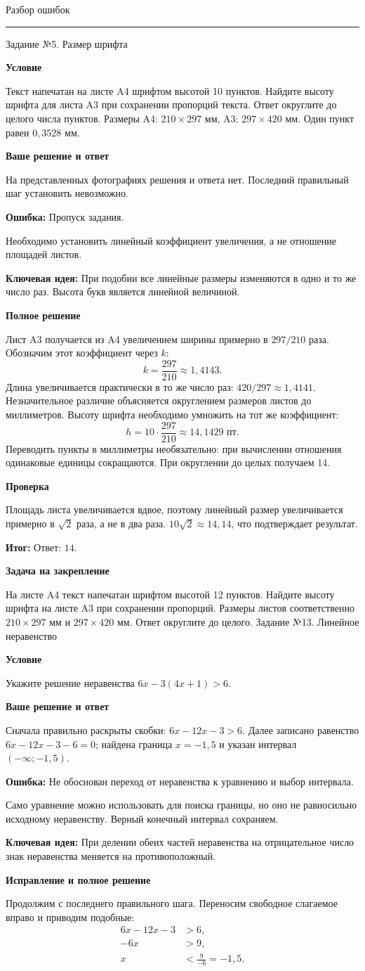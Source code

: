 \documentclass[a4paper,12pt]{article}
\newcommand{\task}[2]{\clearpage\phantomsection\label{task:#1}{\Large\color{darkaccent} Задание №#1. #2}\par\vspace{2mm}{\color{accent}\hrule}\vspace{2mm}}
\newcommand{\sub}[1]{\par\smallskip\textcolor{darkaccent}{\textbf{#1}}\par}
\newcommand{\error}[1]{\par\textcolor{err}{\textbf{Ошибка:}} #1\par}
\newcommand{\idea}[1]{\par\textcolor{darkaccent}{\textbf{Ключевая идея:}} #1\par}
\newcommand{\result}[1]{\par\textcolor{darkaccent}{\textbf{Итог:}} #1\par}
\newcommand{\practice}[1]{\par\medskip{\color{accent}\hrule}\smallskip\textcolor{darkaccent}{\textbf{Задача на закрепление}}\par #1}
\newcommand{\missing}{\sub{Ваше решение и ответ}На представленных фотографиях решения и ответа нет. Последний правильный шаг установить невозможно.}
\begin{document}
\begin{center}
{\Huge\color{darkaccent} Разбор ошибок}\par\bigskip
{\color{accent}\rule{.55\linewidth}{.5pt}}
\end{center}
\vspace*{\fill}
\task{5}{Размер шрифта}
\sub{Условие}
Текст напечатан на листе A4 шрифтом высотой 10 пунктов. Найдите высоту шрифта для листа A3 при сохранении пропорций текста. Ответ округлите до целого числа пунктов. Размеры A4: $210\times297$ мм, A3: $297\times420$ мм. Один пункт равен $0{,}3528$ мм.
\missing
\error{Пропуск задания.} Необходимо установить линейный коэффициент увеличения, а не отношение площадей листов.
\idea{При подобии все линейные размеры изменяются в одно и то же число раз. Высота букв является линейной величиной.}
\sub{Полное решение}
Лист A3 получается из A4 увеличением ширины примерно в $297/210$ раза. Обозначим этот коэффициент через $k$:
\[
k=\frac{297}{210}\approx1{,}4143.
\]
Длина увеличивается практически в то же число раз: $420/297\approx1{,}4141$. Незначительное различие объясняется округлением размеров листов до миллиметров.
Высоту шрифта необходимо умножить на тот же коэффициент:
\[
h=10\cdot\frac{297}{210}\approx14{,}1429\text{ пт}.
\]
Переводить пункты в миллиметры необязательно: при вычислении отношения одинаковые единицы сокращаются. При округлении до целых получаем 14.
\sub{Проверка}
Площадь листа увеличивается вдвое, поэтому линейный размер увеличивается примерно в $\sqrt{2}$ раза, а не в два раза. $10\sqrt{2}\approx14{,}14$, что подтверждает результат.
\result{Ответ: $14$.}
\practice{На листе A4 текст напечатан шрифтом высотой 12 пунктов. Найдите высоту шрифта на листе A3 при сохранении пропорций. Размеры листов соответственно $210\times297$ мм и $297\times420$ мм. Ответ округлите до целого.}
\task{13}{Линейное неравенство}
\sub{Условие}
Укажите решение неравенства $6x-3(4x+1)>6$.
\sub{Ваше решение и ответ}
Сначала правильно раскрыты скобки: $6x-12x-3>6$. Далее записано равенство $6x-12x-3-6=0$; найдена граница $x=-1{,}5$ и указан интервал $(-\infty;-1{,}5)$.
\error{Не обоснован переход от неравенства к уравнению и выбор интервала.} Само уравнение можно использовать для поиска границы, но оно не равносильно исходному неравенству. Верный конечный интервал сохраняем.
\idea{При делении обеих частей неравенства на отрицательное число знак неравенства меняется на противоположный.}
\sub{Исправление и полное решение}
Продолжим с последнего правильного шага. Переносим свободное слагаемое вправо и приводим подобные:
\begin{align*}
6x-12x-3&>6,\\
-6x&>9,\\
x&<\frac{9}{-6}=-1{,}5.
\end{align*}
\end{document}
